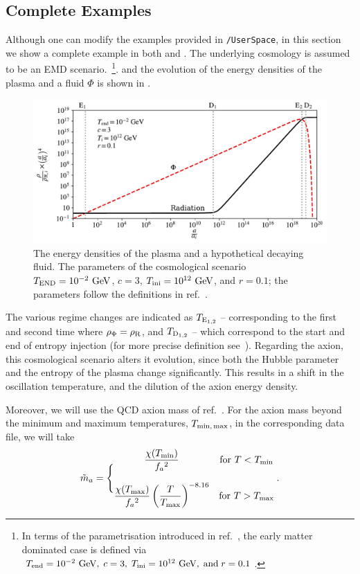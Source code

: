 \documentclass[11pt,a4paper]{article}
\begin{document}
\subsection{Complete Examples}\label{sec:complete_examples}
%
Although one can modify the examples provided in {\tt \mimes/UserSpace}, in this section we show a complete example in both \CPP and \PY. 
%
The underlying cosmology is assumed to be an EMD scenario.~\footnote{In terms of the parametrisation introduced in ref.~\cite{Arias:2019uol,Arias:2020qty},  the early matter dominated case is defined via  $T_{\rm end}=10^{-2} ~{\rm GeV},\; c=3, \; T_{\rm ini}=10^{12} ~{\rm GeV}, \; \text{and}\; r=0.1$.}.
%
and the evolution of the energy densities of the plasma and a fluid $\Phi$ is shown in .
%
\begin{figure}[t]
	\includegraphics[width=1\textwidth]{figs/energy_densities.pdf}
	\caption{The energy densities of the plasma and a hypothetical decaying fluid. The parameters of the cosmological scenario  $T_{\rm END}=10^{-2}~{\rm GeV}$, $c=3$, $T_{\rm ini}=10^{12}~{\rm GeV}$, and $r=0.1$; the parameters  follow the definitions in ref.~\cite{Arias:2020qty}. }
	\label{fig:energy_densities}
\end{figure}
%
The various regime changes are indicated as $T_{{\rm E}_{1,2}}$ -- corresponding to the first and second time where $\rho_{\Phi} = \rho_{\rm R}$,  and $T_{{\rm D}_{1,2}}$ -- which correspond to the start and end of entropy injection (for more precise definition see~\cite{Arias:2020qty}). Regarding the axion, this cosmological scenario alters it evolution, since both the Hubble parameter and the entropy of the plasma change significantly. This results in a shift in the oscillation temperature, and the dilution of the axion energy density.

Moreover, we will use the QCD axion mass of ref.~\cite{Borsanyi:2016ksw}. For the axion mass beyond the minimum and maximum temperatures, $T_{\rm min, \, max}$, in the corresponding data file, we will take
%
\begin{equation}
	\tilde m_{a}{} = \Bigg\{
	\begin{matrix}
		\dfrac{\chi(T_{\rm min})}{f_{a}{}^2} & \text{for } T<T_{\rm min} 
		\\ \\
		\dfrac{\chi(T_{\rm max})}{f_{a}{}^2}   \left( \dfrac{T}{T_{\rm max}} \right)^{-8.16} & \text{for } T>T_{\rm max} 
	\end{matrix} \;.
	\label{eq:axM-limits}
\end{equation}
\end{document}
